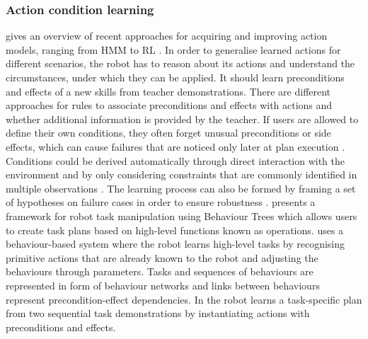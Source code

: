 \subsubsection{Action condition learning}\label{sssec:Action condition learning}
\cite{ingrand2017deliberation} gives an overview of recent approaches for acquiring and improving action models, ranging from HMM \cite{fox2006robot} to RL \cite{sutton1998reinforcement}.
In order to generalise learned actions for different scenarios, the robot has to reason about its actions and understand the circumstances, under which they can be applied. 
It should learn preconditions and effects of a new skills from teacher demonstrations.
There are different approaches for rules to associate preconditions and effects with actions and whether additional information is provided by the teacher.
If users are allowed to define their own conditions, they often forget unusual preconditions or side effects, which can cause failures that are noticed only later at plan execution \cite{gil1994learning}.
Conditions could be derived automatically through direct interaction with the environment and by only considering constraints that are commonly identified in multiple observations \cite{ekvall2008robot}.
The learning process can also be formed by framing a set of hypotheses on failure cases in order to ensure robustness \cite{yildiz2013learning}.
\cite{guerin2015framework} presents a framework for robot task manipulation using Behaviour Trees which allows users to create task plans based on high-level functions known as operations.
\cite{nicolescu2003natural} uses a behaviour-based system where the robot learns high-level tasks by recognising primitive actions that are already known to the robot and adjusting the behaviours through parameters.
Tasks and sequences of behaviours are represented in form of behaviour networks and links between behaviours represent precondition-effect dependencies.
In \cite{veeraraghavan2008teaching} the robot learns a task-specific plan from two sequential task demonstrations by instantiating actions with preconditions and effects.

